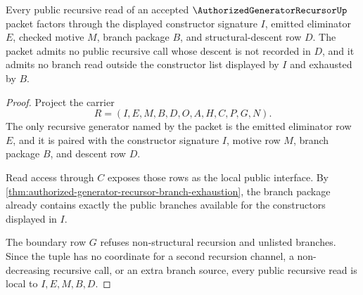 \begin{theorem}
\label{thm:authorized-generator-recursor-structural-descent-locality}
Every public recursive read of an accepted $\AuthorizedGeneratorRecursorUp$ packet factors through the displayed constructor signature $I$, emitted eliminator $E$, checked motive $M$, branch package $B$, and structural-descent row $D$. The packet admits no public recursive call whose descent is not recorded in $D$, and it admits no branch read outside the constructor list displayed by $I$ and exhausted by $B$.
\end{theorem}
\begin{proof}
Project the carrier
$$
R=(I,E,M,B,D,O,A,H,C,P,G,N).
$$
The only recursive generator named by the packet is the emitted eliminator row $E$, and it is paired with the constructor signature $I$, motive row $M$, branch package $B$, and descent row $D$.

Read access through $C$ exposes those rows as the local public interface. By \autoref{thm:authorized-generator-recursor-branch-exhaustion}, the branch package already contains exactly the public branches available for the constructors displayed in $I$.

The boundary row $G$ refuses non-structural recursion and unlisted branches. Since the tuple has no coordinate for a second recursion channel, a non-decreasing recursive call, or an extra branch source, every public recursive read is local to $I,E,M,B,D$.
\end{proof}

